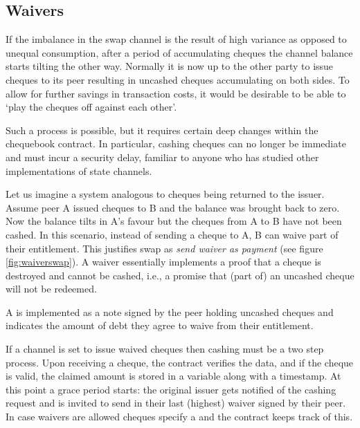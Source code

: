 \subsection{Waivers}

If the imbalance in the swap channel is the result of high variance as opposed to unequal consumption, after a period of accumulating cheques the channel balance starts tilting the other way. Normally it is now up to the other party to issue cheques to its peer resulting in uncashed cheques accumulating on both sides.
To allow for further savings in transaction costs, it would be desirable to be able to `play the cheques off against each other'.

Such a process is possible, but it requires certain deep changes within the chequebook contract. In particular, cashing cheques can no longer be immediate and must incur a security delay, familiar to anyone who has studied other implementations of state channels.

Let us imagine a system analogous to cheques being returned to the issuer.  
Assume peer A issued cheques to B and the balance was brought back to zero. Now the balance tilts in A's favour but the cheques from A to B have not been cashed. In this scenario, instead of sending a cheque to A, B can waive part of their entitlement. This justifies swap as \emph{send waiver as payment} (see figure \ref{fig:waiverswap}).
A waiver essentially implements a proof that a cheque is destroyed and cannot be cashed, i.e., a promise that (part of) an uncashed cheque will not be redeemed.

A  is implemented as a note signed by the peer holding uncashed cheques%
and indicates the amount of debt they agree to waive from their entitlement.

If a channel is set to issue waived cheques then cashing must be a two step process.
Upon receiving a cheque, the contract verifies the data, and %
if the cheque is valid, the claimed amount is stored in a variable along with a timestamp. At this point a grace period starts: the original issuer gets notified of the cashing request and is invited to send in their last (highest) waiver signed by their peer. In case waivers are allowed cheques specify a  and the contract keeps track of this.

